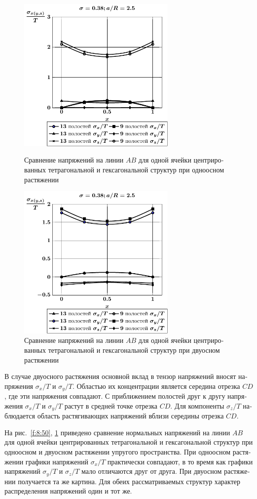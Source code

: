 \begin{russian}
\begin{figure}[h!]
\centering\footnotesize
\parbox[b]{7.5cm}{\centering\includegraphics[width=7.7cm]{spheres-cav13-9-a25-t1.pdf}
\caption{Сравнение напряжений на линии $AB$ для одной ячейки центрированных тетрагональной и гексагональной структур при одноосном растяжении
\label{f:8:50}}}\hfil\hfil
\parbox[b]{7.5cm}{\centering\includegraphics[width=7.7cm]{spheres-cav13-9-a25-t2.pdf}
\caption{Сравнение напряжений на линии $AB$ для одной ячейки центрированных тетрагональной и гексагональной структур при двуосном растяжении
\label{f:8:51}}}
\end{figure}

В случае двуосного растяжения основной вклад в тензор напряжений вносят напряжения $\sigma_x/T$ и $\sigma_y/T$. Областью их концентрации является середина отрезка $CD$, где эти напряжения совпадают. С приближением полостей друг к другу напряжения $\sigma_x/T$ и $\sigma_y/T$ растут в средней точке отрезка $CD$. Для компоненты $\sigma_z/T$ наблюдается область растягивающих напряжений вблизи середины отрезка $CD$.

На рис.~\ref{f:8:50}, \ref{f:8:51} приведено сравнение нормальных напряжений на линии $AB$ для одной ячейки центрированных тетрагональной и гексагональной структур при одноосном и двуосном растяжении упругого пространства. При одноосном растяжении графики напряжений $\sigma_x/T$ практически совпадают, в то время как графики напряжений $\sigma_y/T$ и $\sigma_z/T$ мало отличаются друг от друга. При двуосном растяжении получается та же картина. Для обеих рассматриваемых структур характер распределения напряжений один и тот же.


\end{russian}
